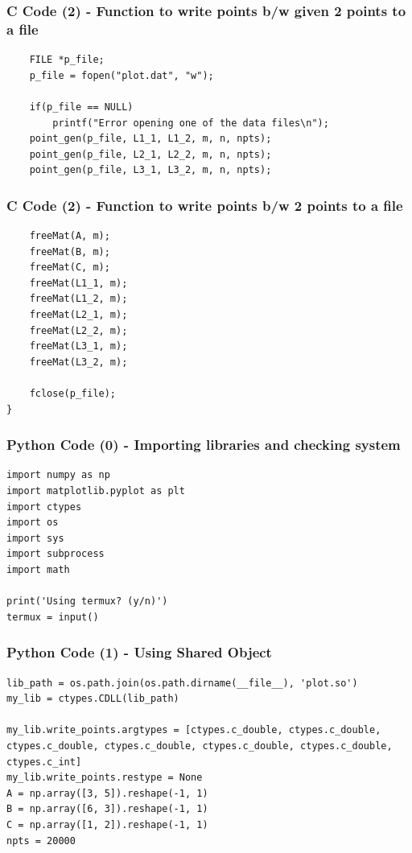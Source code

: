 \documentclass{beamer}
\begin{document}
\begin{frame}[fragile]
    \frametitle{C Code (2) - Function to write points b/w given 2 points to a file}
    \begin{lstlisting}
    FILE *p_file;
    p_file = fopen("plot.dat", "w");
    
    if(p_file == NULL)
        printf("Error opening one of the data files\n");
    point_gen(p_file, L1_1, L1_2, m, n, npts);
    point_gen(p_file, L2_1, L2_2, m, n, npts);
    point_gen(p_file, L3_1, L3_2, m, n, npts);
    \end{lstlisting}
\end{frame}

\begin{frame}[fragile]
    \frametitle{C Code (2) - Function to write points b/w 2 points to a file}
    \begin{lstlisting}
    freeMat(A, m);
    freeMat(B, m);
    freeMat(C, m);
    freeMat(L1_1, m);
    freeMat(L1_2, m);
    freeMat(L2_1, m);
    freeMat(L2_2, m);
    freeMat(L3_1, m);
    freeMat(L3_2, m);

    fclose(p_file);
}
    \end{lstlisting}
\end{frame}

\begin{frame}[fragile]
    \frametitle{Python Code (0) - Importing libraries and checking system}
    \begin{lstlisting}
import numpy as np
import matplotlib.pyplot as plt
import ctypes
import os
import sys
import subprocess
import math

print('Using termux? (y/n)')
termux = input()
\end{lstlisting}
\end{frame}

\begin{frame}[fragile]
    \frametitle{Python Code (1) - Using Shared Object}
    \begin{lstlisting}
lib_path = os.path.join(os.path.dirname(__file__), 'plot.so')
my_lib = ctypes.CDLL(lib_path)

my_lib.write_points.argtypes = [ctypes.c_double, ctypes.c_double, ctypes.c_double, ctypes.c_double, ctypes.c_double, ctypes.c_double, ctypes.c_int]
my_lib.write_points.restype = None
A = np.array([3, 5]).reshape(-1, 1)
B = np.array([6, 3]).reshape(-1, 1)
C = np.array([1, 2]).reshape(-1, 1)
npts = 20000
\end{lstlisting}
\end{frame}
\end{document}
